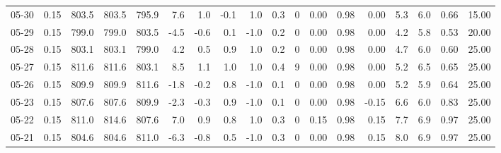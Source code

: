 \begin{threeparttable}
{\begin{tabular}{lrrrrrrrrrrrrrrrrr}
  05-30 &     0.15 & 803.5 & 803.5 & 795.9 &        7.6 &            1.0 &                      -0.1 &                      1.0 &                 0.3 &              0 &       0.00 &      0.98 &           0.00 &              5.3 &                 6.0 &            0.66 &                  15.00 \\
  05-29 &     0.15 & 799.0 & 799.0 & 803.5 &       -4.5 &           -0.6 &                       0.1 &                     -1.0 &                 0.2 &              0 &       0.00 &      0.98 &           0.00 &              4.2 &                 5.8 &            0.53 &                  20.00 \\
  05-28 &     0.15 & 803.1 & 803.1 & 799.0 &        4.2 &            0.5 &                       0.9 &                      1.0 &                 0.2 &              0 &       0.00 &      0.98 &           0.00 &              4.7 &                 6.0 &            0.60 &                  25.00 \\
  05-27 &     0.15 & 811.6 & 811.6 & 803.1 &        8.5 &            1.1 &                       1.0 &                      1.0 &                 0.4 &              9 &       0.00 &      0.98 &           0.00 &              5.2 &                 6.5 &            0.65 &                  25.00 \\
  05-26 &     0.15 & 809.9 & 809.9 & 811.6 &       -1.8 &           -0.2 &                       0.8 &                     -1.0 &                 0.1 &              0 &       0.00 &      0.98 &           0.00 &              5.2 &                 5.9 &            0.64 &                  25.00 \\
  05-23 &     0.15 & 807.6 & 807.6 & 809.9 &       -2.3 &           -0.3 &                       0.9 &                     -1.0 &                 0.1 &              0 &       0.00 &      0.98 &          -0.15 &              6.6 &                 6.0 &            0.83 &                  25.00 \\
  05-22 &     0.15 & 811.0 & 814.6 & 807.6 &        7.0 &            0.9 &                       0.8 &                      1.0 &                 0.3 &              0 &       0.15 &      0.98 &           0.15 &              7.7 &                 6.9 &            0.97 &                  25.00 \\
  05-21 &     0.15 & 804.6 & 804.6 & 811.0 &       -6.3 &           -0.8 &                       0.5 &                     -1.0 &                 0.3 &              0 &       0.00 &      0.98 &           0.15 &              8.0 &                 6.9 &            0.97 &                  25.00 \\

\end{tabular}}
\end{threeparttable}
